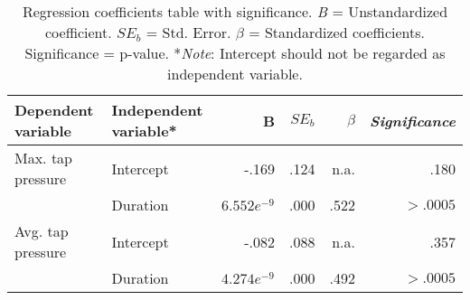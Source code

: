 \begin{table}[ht]
\centering
\begin{tabular}{@{}llrrrr@{}}
\textbf{Dependent variable} & \textbf{Independent variable*} & B             & $SE_b$ & $\beta$ & \textit{Significance} \\ \midrule
Max. tap pressure           & Intercept                      & -.169         & .124   & n.a.    & .180                  \\
                            & Duration                       & $6.552e^{-9}$ & .000   & .522    & $> .0005$             \\ \midrule
Avg. tap pressure           & Intercept                      & -.082         & .088   & n.a.    & .357                  \\
                            & Duration                       & $4.274e^{-9}$ & .000   & .492    & $> .0005$            
\end{tabular}
\caption{Regression coefficients table with significance. \textit{B} = Unstandardized coefficient. \textit{$SE_b$} = Std. Error. \textit{$\beta$} = Standardized coefficients. Significance = p-value. *\textit{Note}: Intercept should not be regarded as independent variable.}
\label{tab:secondary_regression_coefficients}
\end{table}